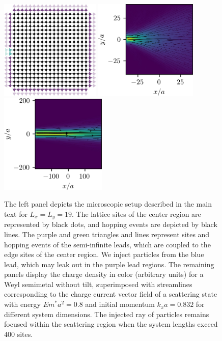 \documentclass[submission, Phys]{SciPost}
\begin{document}
\begin{figure}[ht]
    \centering
    \includegraphics[height=4.764cm]{fig/system.jpg}
    \includegraphics[height=4.764cm]{fig/current_size_scaling3.jpg}
    \includegraphics[height=4.764cm]{fig/current_size_scaling5.jpg}
    \caption{The left panel depicts the microscopic setup described in the main text for $L_x=L_y=19$. The lattice sites of the center region are represented by black dots, and hopping events are depicted by black lines. The purple and green triangles and lines represent sites and hopping events of the semi-infinite leads, which are coupled to the edge sites of the center region. We inject particles from the blue lead, which may leak out in the purple lead regions. The remaining panels display the charge density in color (arbitrary units) for a Weyl semimetal without tilt, superimposed with streamlines corresponding to the charge current vector field of a scattering state with energy $Em^*a^2=0.8$ and initial momentum $k_xa=0.832$ for different system dimensions. The injected ray of particles remains focused within the scattering region when the system lengths exceed $400$ sites.}
    \label{fig:device_setup}
\end{figure}
\end{document}
